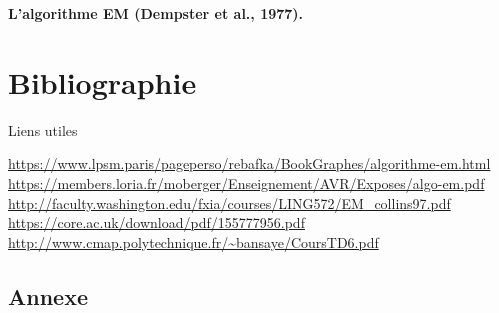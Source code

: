 \documentclass[frenchb]{report}
\newcommand{\1}{\mathbbm{1}}
\theoremstyle{definition}\newtheorem{defn}{Définition}
\theoremstyle{definition}\newtheorem{exm}{Exemple}
\theoremstyle{definition}\newtheorem{nota}{Notation}
\theoremstyle{definition}\newtheorem{rem}{Remarque}
\begin{document}
\begin{algorithm}
	\caption{\textbf{L’algorithme EM (Dempster et al., 1977).}}
	\begin{algorithmic}[1]
		\ENSURE
		\ENDWHILE
	\end{algorithmic}
\end{algorithm}


\chapter*{Bibliographie}
 
Liens utiles

\url{https://www.lpsm.paris/pageperso/rebafka/BookGraphes/algorithme-em.html} \newline
\url{https://members.loria.fr/moberger/Enseignement/AVR/Exposes/algo-em.pdf} \newline
\url{http://faculty.washington.edu/fxia/courses/LING572/EM_collins97.pdf}\newline
\url{https://core.ac.uk/download/pdf/155777956.pdf}\newline
\url{http://www.cmap.polytechnique.fr/~bansaye/CoursTD6.pdf}


\pagebreak
\begin{appendix}
\chapter{Annexe}

\end{appendix}
\end{document}

